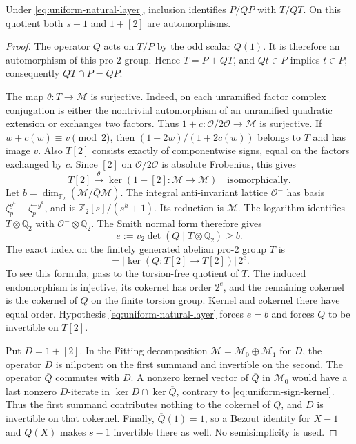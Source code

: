 \begin{lemma}
\label{lem:uniform-operator-inverses}
Under \eqref{eq:uniform-natural-layer}, inclusion identifies
\(P/QP\) with \(T/QT\). On this quotient both \(s-1\) and \(1+[2]\)
are automorphisms.
\end{lemma}
\begin{proof}
The operator \(Q\) acts on \(T/P\) by the odd scalar \(Q(1)\).
It is therefore an automorphism of this pro-\(2\) group. Hence
\(T=P+QT\), and \(Qt\in P\) implies \(t\in P\); consequently
\(QT\cap P=QP\).

The map \(\theta:T\to\mathscr M\) is surjective. Indeed, on each
unramified factor complex conjugation is either the nontrivial
automorphism of an unramified quadratic extension or exchanges
two factors. Thus \(1+c:\mathcal O/2\mathcal O\to\mathscr M\) is
surjective. If \(w+c(w)\equiv v\pmod2\), then
\((1+2w)/(1+2c(w))\) belongs to \(T\) and has image \(v\).
Also \(T[2]\) consists exactly of componentwise signs, equal on
the factors exchanged by \(c\). Since \([2]\) on
\(\mathcal O/2\mathcal O\) is absolute Frobenius, this gives
\begin{equation}
 T[2]\xrightarrow{\ \theta\ }\ker(1+[2]:\mathscr M\to\mathscr M)
 \quad\text{isomorphically}.
 \label{eq:uniform-sign-kernel}
\end{equation}
Let \(b=\dim_{\mathbb F_2}(\mathscr M/\overline Q\mathscr M)\).
The integral anti-invariant lattice \(\mathcal O^-\) has basis
\(\zeta_p^{g^k}-\zeta_p^{-g^k}\), and is
\(\mathbb Z_2[s]/(s^h+1)\). Its reduction is \(\mathscr M\).
The logarithm identifies \(T\otimes\mathbb Q_2\) with
\(\mathcal O^-\otimes\mathbb Q_2\). The Smith normal form therefore
gives
\[
 e:=v_2\det(Q\mid T\otimes\mathbb Q_2)\geq b.
\]
The exact index on the finitely generated abelian pro-\(2\) group
\(T\) is
\begin{equation}
 [T:QT]=|\ker(Q:T[2]\to T[2])|\,2^e.
 \label{eq:uniform-sign-index}
\end{equation}
To see this formula, pass to the torsion-free quotient of \(T\).
The induced endomorphism is injective, its cokernel has order
\(2^e\), and the remaining cokernel is the cokernel of \(Q\)
on the finite torsion group. Kernel and cokernel there have equal
order. Hypothesis \eqref{eq:uniform-natural-layer} forces \(e=b\)
and forces \(Q\) to be invertible on \(T[2]\).

Put \(D=1+[2]\). In the Fitting decomposition
\(\mathscr M=\mathscr M_0\oplus\mathscr M_1\) for \(D\),
the operator \(D\) is nilpotent on the first summand and invertible
on the second. The operator \(\overline Q\) commutes with \(D\).
A nonzero kernel vector of \(\overline Q\) in \(\mathscr M_0\)
would have a last nonzero \(D\)-iterate in
\(\ker D\cap\ker\overline Q\), contrary to
\eqref{eq:uniform-sign-kernel}. Thus the first summand contributes
nothing to the cokernel of \(\overline Q\), and \(D\) is invertible
on that cokernel. Finally, \(\overline Q(1)=1\), so a Bezout
identity for \(X-1\) and \(\overline Q(X)\) makes \(s-1\)
invertible there as well. No semisimplicity is used.
\end{proof}

